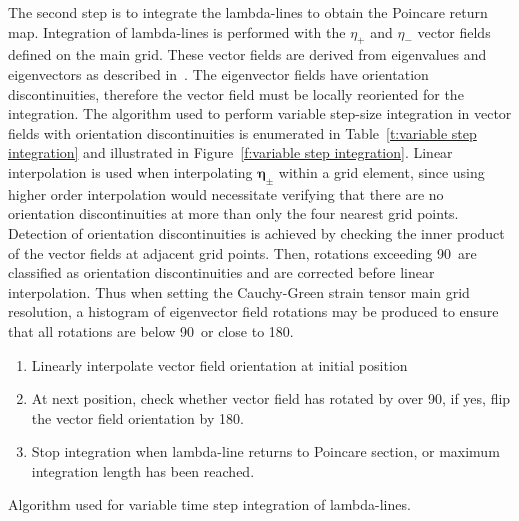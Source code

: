 \documentclass{article}
\begin{document}
The second step is to integrate the lambda-lines to obtain the Poincare return map. Integration of lambda-lines is performed with the $\eta_+$ and $\eta_-$ vector fields defined on the main grid. These vector fields are derived from eigenvalues and eigenvectors as described in~\textcite{farazmand12:_comput_lagran}. The eigenvector fields have orientation discontinuities, therefore the vector field must be locally reoriented for the integration. The algorithm used to perform variable step-size integration in vector fields with orientation discontinuities is enumerated in Table~\ref{t:variable step integration} and illustrated in Figure~\ref{f:variable step integration}. Linear interpolation is used when interpolating $\boldsymbol \eta_\pm$ within a grid element, since using higher order interpolation would necessitate verifying that there are no orientation discontinuities at more than only the four nearest grid points. Detection of orientation discontinuities is achieved by checking the inner product of the vector fields at adjacent grid points. Then, rotations exceeding 90\degree\, are classified as orientation discontinuities and are corrected before linear interpolation. Thus when setting the Cauchy-Green strain tensor main grid resolution, a histogram of eigenvector field rotations may be produced to ensure that all rotations are below 90\degree\, or close to 180\degree.

\begin{table}
\begin{enumerate}
\item Linearly interpolate vector field orientation at initial position
\item At next position, check whether vector field has rotated by over 90\degree, if yes, flip the vector field orientation by 180\degree.
\item Stop integration when lambda-line returns to Poincare section, or maximum integration length has been reached.
\end{enumerate}
\caption{Algorithm used for variable time step integration of lambda-lines.}
\label{t:variable step integration}
\end{table}
\end{document}
